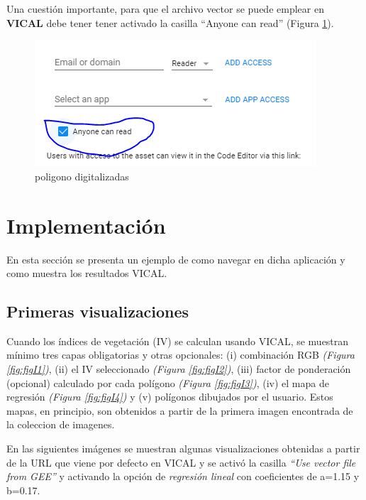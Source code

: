 \documentclass[
]{book}
\begin{document}
Una cuestión importante, para que el archivo vector se puede emplear en \textbf{VICAL} debe tener tener activado la casilla ``Anyone can read'' (Figura \ref{fig:figG13}).

\begin{figure}

{\centering \includegraphics[width=0.75\linewidth]{./images/Figure6} 

}

\caption{poligono digitalizadas}\label{fig:figG13}
\end{figure}

\hypertarget{implementaciuxf3n}{%
\chapter{Implementación}\label{implementaciuxf3n}}

En esta sección se presenta un ejemplo de como navegar en dicha aplicación y como muestra los resultados VICAL.

\hypertarget{PriVis}{%
\section{Primeras visualizaciones}\label{PriVis}}

Cuando los índices de vegetación (IV) se calculan usando VICAL, se muestran mínimo tres capas obligatorias y otras opcionales: (i) combinación RGB \emph{(Figura \ref{fig:figI1})}, (ii) el IV seleccionado \emph{(Figura \ref{fig:figI2})}, (iii) factor de ponderación (opcional) calculado por cada polígono \emph{(Figura \ref{fig:figI3})}, (iv) el mapa de regresión \emph{(Figura \ref{fig:figI4})} y (v) polígonos dibujados por el usuario. Estos mapas, en principio, son obtenidos a partir de la primera imagen encontrada de la coleccion de imagenes.

En las siguientes imágenes se muestran algunas visualizaciones obtenidas a partir de la URL que viene por defecto en VICAL y se activó la casilla \emph{``Use vector file from GEE''} y activando la opción de \emph{regresión lineal} con coeficientes de a=1.15 y b=0.17.
\end{document}
